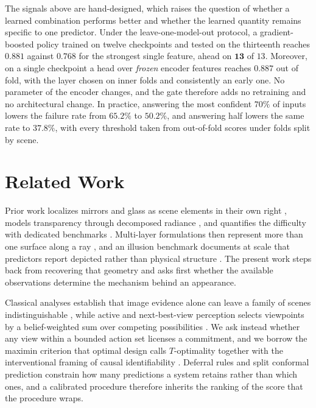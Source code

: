 \documentclass{article} %
\theoremstyle{defstyle}
\theoremstyle{plain}
\begin{document}
The signals above are hand-designed, which raises the question of whether a learned
combination performs better and whether the learned quantity remains specific to one
predictor. Under the leave-one-model-out protocol, a gradient-boosted policy trained on
twelve checkpoints and tested on the thirteenth reaches $\mathbf{0.881}$ against $0.768$
for the strongest single feature, ahead on $\mathbf{13}$ of $13$. Moreover, on a single
checkpoint a head over \emph{frozen} encoder features reaches $\mathbf{0.887}$ out of fold,
with the layer chosen on inner folds and consistently an early one. No parameter of the
encoder changes, and the gate therefore adds no retraining and no architectural change. In
practice, answering the most confident $70\%$ of inputs lowers the failure rate from
$65.2\%$ to $50.2\%$, and answering half lowers the same rate to $37.8\%$, with every
threshold taken from out-of-fold scores under folds split by scene.

\section{Related Work}
\label{sec:related}

Prior work localizes mirrors and glass as scene elements in their own right
\citep{mirrornet2019,glassdetection2020,mirror3d2021}, models transparency through
decomposed radiance \citep{glint2026}, and quantifies the difficulty with dedicated
benchmarks \citep{booster2023,clearpose2022,dreds2022}. Multi-layer formulations then
represent more than one surface along a ray
\citep{layereddepth2025,seegroup2026,depthfocus2026}, and an illusion benchmark documents at
scale that predictors report depicted rather than physical structure \citep{illusion2025}.
The present work steps back from recovering that geometry and asks first whether the
available observations determine the mechanism behind an appearance.

Classical analyses establish that image evidence alone can leave a family of scenes
indistinguishable \citep{belhumeur1999basrelief,sturm1997critical,oren1997theory,kutulakos2008theory},
while active and next-best-view perception selects viewpoints by a belief-weighted sum over
competing possibilities \citep{nbvreflective2022,rainforth2024}. We ask instead whether any
view within a bounded action set licenses a commitment, and we borrow the maximin criterion
that optimal design calls $T$-optimality
\citep{atkinson1975design,hunter1965experimental} together with the interventional framing
of causal identifiability \citep{citris2022}. Deferral rules \citep{chow1970,geifman2017,selectivenet2019}
and split conformal prediction \citep{vovk2005,lei2018} constrain how many predictions a
system retains rather than which ones, and a calibrated procedure therefore inherits the
ranking of the score that the procedure wraps.
\end{document}
